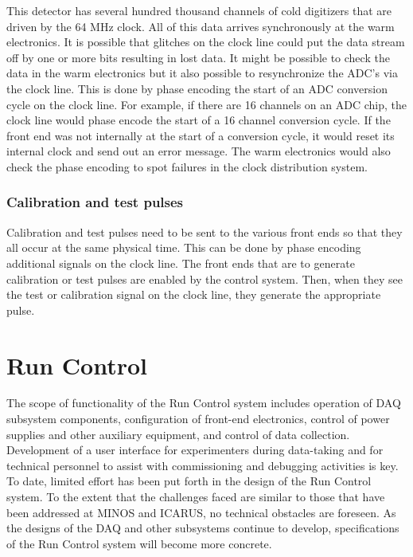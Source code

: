 This detector has several hundred thousand channels of cold digitizers
that are driven by the 64 MHz clock.  All of this data arrives
synchronously at the warm electronics.  It is possible that glitches
on the clock line could put the data stream off by one or more bits
resulting in lost data.  It might be possible to check the data in the
warm electronics but it also possible to resynchronize the ADC’s via
the clock line.  This is done by phase encoding the start of an ADC
conversion cycle on the clock line.  For example, if there are 16
channels on an ADC chip, the clock line would phase encode the start
of a 16 channel conversion cycle.  If the front end was not internally
at the start of a conversion cycle, it would reset its internal clock
and send out an error message.  The warm electronics would also check
the phase encoding to spot failures in the clock distribution system.

\subsubsection{Calibration and test pulses}

Calibration and test pulses need to be sent to the various front ends
so that they all occur at the same physical time.  This can be done by
phase encoding additional signals on the clock line.  The front ends
that are to generate calibration or test pulses are enabled by the
control system.  Then, when they see the test or calibration signal on
the clock line, they generate the appropriate pulse.

\section{Run Control }
\label{sec:v5-trig-runcontrol}

The scope of 
functionality of the Run Control system includes operation of DAQ 
subsystem components, configuration 
of front-end electronics, control of power supplies and other auxiliary 
equipment, and control of data collection.  Development of a 
user interface for experimenters during data-taking and for technical 
personnel to assist with commissioning and debugging activities is key.  To date, 
limited effort has been put forth in the design of the Run Control system.
To the extent that the challenges faced are similar to those that have 
been addressed at MINOS and ICARUS, no technical obstacles are foreseen.  
As the designs of the DAQ and other subsystems continue to develop, 
specifications of the Run Control system will become more concrete.

